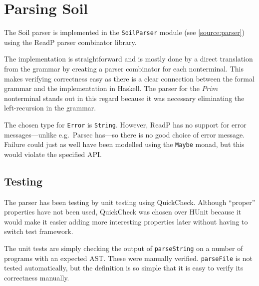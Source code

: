 
\section{Parsing Soil}

The Soil parser is implemented in the \verb|SoilParser| module (see
\autoref{source:parser}) using the ReadP parser combinator library.

The implementation is straightforward and is mostly done by a direct
translation from the grammar by creating a parser combinator for each
nonterminal. This makes verifying correctness easy as there is a clear
connection between the formal grammar and the implementation in Haskell. The
parser for the $Prim$ nonterminal stands out in this regard because it was
necessary eliminating the left-recursion in the grammar.

The chosen type for \verb|Error| is \verb|String|. However, ReadP has no
support for error messages---unlike e.g.\ Parsec has---so there is no good
choice of error message. Failure could just as well have been modelled using
the \verb|Maybe| monad, but this would violate the specified API.

\subsection{Testing}
\label{parser_testing}

The parser has been testing by unit testing using QuickCheck. Although
``proper'' properties have not been used, QuickCheck was chosen over HUnit
because it would make it easier adding more interesting properties later
without having to switch test framework.

The unit tests are simply checking the output of \verb|parseString| on a number
of programs with an expected AST. These were manually verified.
\verb|parseFile| is not tested automatically, but the definition is so simple
that it is easy to verify its correctness manually.
